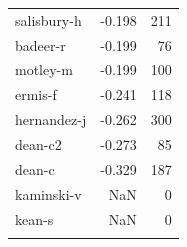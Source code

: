 \documentclass{vldb}
\begin{document}
\begin{appendix}
\begin{supertabular}{ l r r }
salisbury-h    &                -0.198 &     211 \\
badeer-r       &                -0.199 &      76 \\
motley-m       &                -0.199 &     100 \\
ermis-f        &                -0.241 &     118 \\
hernandez-j    &                -0.262 &     300 \\
dean-c2        &                -0.273 &      85 \\
dean-c         &                -0.329 &     187 \\
kaminski-v     &                   NaN &       0 \\
kean-s         &                   NaN &       0 \\
\bottomrule
\label{tab:corr}
\end{supertabular}




\end{appendix}
\end{document}
